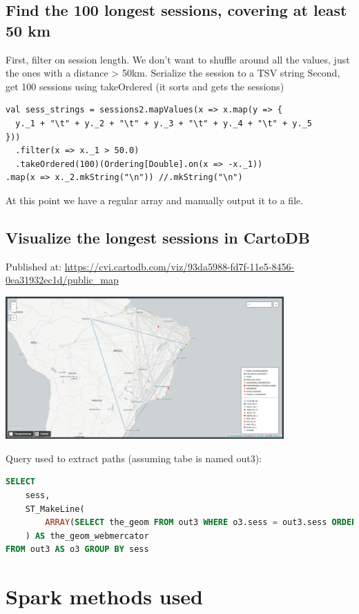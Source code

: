 \documentclass[abstract=on]{article}
\begin{document}
\subsection{Find the 100 longest sessions, covering at least 50 km}
First, filter on session length. We don't want to shuffle around all the values, just the ones with a distance > 50km.
Serialize the session to a TSV string
Second, get 100 sessions using takeOrdered (it sorts and gets the sessions)
\begin{lstlisting}
val sess_strings = sessions2.mapValues(x => x.map(y => {
  y._1 + "\t" + y._2 + "\t" + y._3 + "\t" + y._4 + "\t" + y._5
}))
  .filter(x => x._1 > 50.0)
  .takeOrdered(100)(Ordering[Double].on(x => -x._1))
.map(x => x._2.mkString("\n")) //.mkString("\n")
\end{lstlisting}
At this point we have a regular array and manually output it to a file.


\subsection{Visualize the longest sessions in CartoDB}
Published at:
\url{https://cvi.cartodb.com/viz/93da5988-fd7f-11e5-8456-0ea31932ec1d/public_map}
\begin{center}
\includegraphics[width=0.8\textwidth]{carto.png}
\end{center}

Query used to extract paths (assuming tabe is named out3):
\begin{lstlisting}[language=SQL]
SELECT
    sess,
    ST_MakeLine(
        ARRAY(SELECT the_geom FROM out3 WHERE o3.sess = out3.sess ORDER BY DATE ASC)
    ) AS the_geom_webmercator
FROM out3 AS o3 GROUP BY sess
\end{lstlisting}

\section{Spark methods used}
\end{document}
